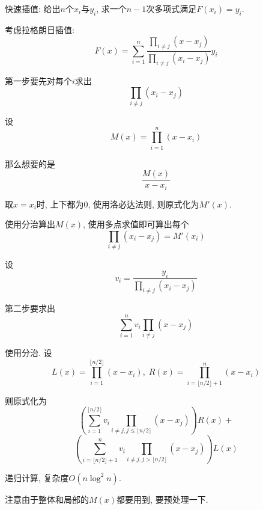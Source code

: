 快速插值: 给出$n$个$x_i$与$y_i$, 求一个$n-1$次多项式满足$F(x_i)=y_i$.

考虑拉格朗日插值: 
$$F(x)=\sum_{i=1}^n\frac{\prod_{i\neq j}(x-x_j)}{\prod_{i\neq j}(x_i-x_j)}y_i$$

第一步要先对每个$i$求出
$$\prod_{i\neq j}(x_i-x_j)$$

设
$$M(x)=\prod_{i=1}^{n}(x-x_i)$$

那么想要的是
$$\frac{M(x)}{x-x_i}$$

取$x=x_i$时, 上下都为0, 使用洛必达法则, 则原式化为$M'(x)$.

使用分治算出$M(x)$, 使用多点求值即可算出每个
$$\prod_{i\neq j}(x_i-x_j)=M'(x_i)$$

设
$$v_i = \frac{y_i}{\prod_{i\neq j}(x_i-x_j)}$$

第二步要求出$$\sum_{i=1}^{n}v_i\prod_{i\neq j}(x-x_j)$$

使用分治. 设
$$L(x)=\prod_{i=1}^{\lfloor n/2\rfloor}(x-x_i), \; R(x)=\prod_{i=\lfloor n/2\rfloor+1}^n(x-x_i)$$

则原式化为
$$\left( \sum_{i=1}^{\lfloor n/2\rfloor}v_i\prod_{i\neq j,j\leq\lfloor n/2\rfloor}(x-x_j)\right)R(x)+$$
$$\left( \sum_{i=\lfloor n/2\rfloor+1}^{n}v_i\prod_{i\neq j,j>\lfloor n/2\rfloor}(x-x_j)\right)L(x)$$

递归计算, 复杂度$O(n\log^2n)$.

注意由于整体和局部的$M(x)$都要用到, 要预处理一下.

\inputminted{cpp}{../src/math/多项式快速插值.cpp}